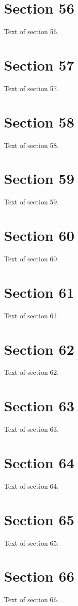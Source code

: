 \documentclass{article}
\begin{document}
\section{Section 56}
Text of section 56.

\section{Section 57}
Text of section 57.

\section{Section 58}
Text of section 58.

\section{Section 59}
Text of section 59.

\section{Section 60}
Text of section 60.

\section{Section 61}
Text of section 61.

\section{Section 62}
Text of section 62.

\section{Section 63}
Text of section 63.

\section{Section 64}
Text of section 64.

\section{Section 65}
Text of section 65.

\section{Section 66}
Text of section 66.
\end{document}
